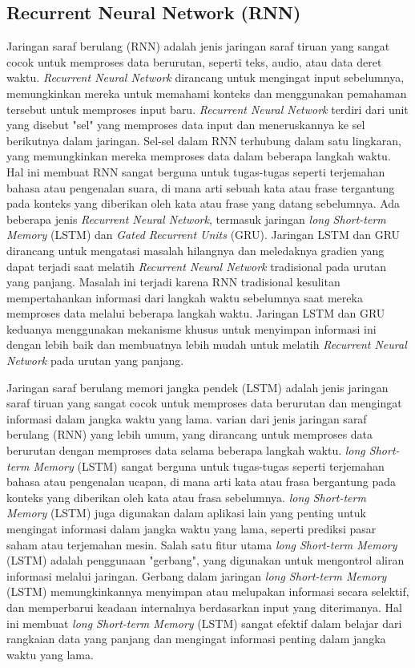 \subsection{Recurrent Neural Network (RNN)}

Jaringan saraf berulang (RNN) adalah jenis jaringan saraf tiruan yang sangat cocok untuk memproses data berurutan, seperti teks, audio, atau data deret waktu. \emph{Recurrent Neural Network} dirancang untuk mengingat
input sebelumnya, memungkinkan mereka untuk memahami konteks dan menggunakan pemahaman tersebut untuk memproses input baru. \emph{Recurrent Neural Network} terdiri dari unit yang disebut "sel" yang memproses data 
input dan meneruskannya ke sel berikutnya dalam jaringan. Sel-sel dalam RNN terhubung dalam satu lingkaran, yang memungkinkan mereka memproses data dalam beberapa langkah waktu. Hal ini membuat RNN sangat berguna 
untuk tugas-tugas seperti terjemahan bahasa atau pengenalan suara, di mana arti sebuah kata atau frase tergantung pada konteks yang diberikan oleh kata atau frase yang datang sebelumnya. Ada beberapa jenis \emph{Recurrent Neural Network}, 
termasuk jaringan \emph{long Short-term Memory} (LSTM) dan \emph{Gated Recurrent Units} (GRU). Jaringan LSTM dan GRU dirancang untuk mengatasi masalah hilangnya dan meledaknya gradien yang dapat terjadi saat melatih
\emph{Recurrent Neural Network} tradisional pada urutan yang panjang. Masalah ini terjadi karena RNN tradisional kesulitan mempertahankan informasi dari langkah waktu sebelumnya saat mereka memproses data melalui 
beberapa langkah waktu. Jaringan LSTM dan GRU keduanya menggunakan mekanisme khusus untuk menyimpan informasi ini dengan lebih baik dan membuatnya lebih mudah untuk melatih \emph{Recurrent Neural Network} pada urutan yang panjang.

Jaringan saraf berulang memori jangka pendek (LSTM) adalah jenis jaringan saraf tiruan yang sangat cocok untuk memproses data berurutan dan mengingat informasi dalam jangka waktu yang lama. varian dari jenis jaringan
saraf berulang (RNN) yang lebih umum, yang dirancang untuk memproses data berurutan dengan memproses data selama beberapa langkah waktu. \emph{long Short-term Memory} (LSTM) sangat berguna untuk tugas-tugas seperti terjemahan bahasa atau 
pengenalan ucapan, di mana arti kata atau frasa bergantung pada konteks yang diberikan oleh kata atau frasa sebelumnya. \emph{long Short-term Memory} (LSTM) juga digunakan dalam aplikasi lain yang penting untuk mengingat informasi dalam 
jangka waktu yang lama, seperti prediksi pasar saham atau terjemahan mesin. Salah satu fitur utama \emph{long Short-term Memory} (LSTM) adalah penggunaan "gerbang", yang digunakan untuk mengontrol aliran informasi 
melalui jaringan. Gerbang dalam jaringan \emph{long Short-term Memory} (LSTM) memungkinkannya menyimpan atau melupakan informasi secara selektif, dan memperbarui keadaan internalnya berdasarkan input yang diterimanya.
Hal ini membuat \emph{long Short-term Memory} (LSTM) sangat efektif dalam belajar dari rangkaian data yang panjang dan mengingat informasi penting dalam jangka waktu yang lama. \parencite{Sak2014}

